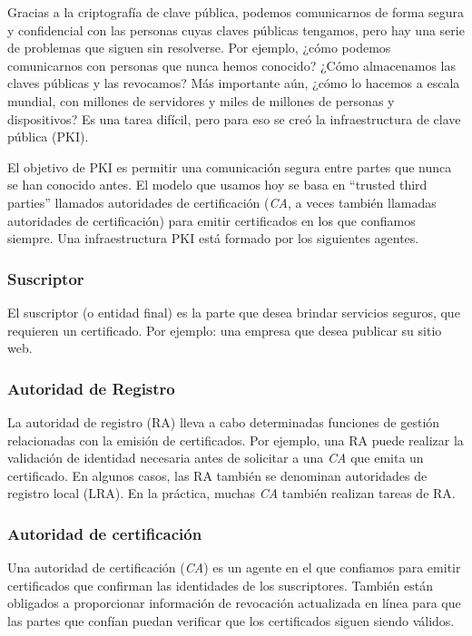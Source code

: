 
Gracias a la criptografía de clave pública, podemos comunicarnos de forma 
segura y confidencial con 
las personas cuyas claves públicas tengamos, pero hay una serie de problemas 
que siguen sin resolverse. Por ejemplo, ¿cómo podemos comunicarnos con personas que 
nunca hemos conocido? ¿Cómo almacenamos las claves públicas y las revocamos? Más 
importante aún, ¿cómo lo hacemos a escala mundial, con millones de servidores y 
miles de millones de personas y dispositivos? Es una tarea difícil, pero para eso 
se creó la infraestructura de clave pública (PKI).

El objetivo de PKI es permitir una comunicación segura entre partes que nunca se 
han conocido antes. El modelo que usamos hoy se basa en “trusted third parties” 
llamados autoridades de certificación (\emph{CA}, a veces también llamadas autoridades 
de certificación) para emitir certificados en los que confiamos siempre. Una 
infraestructura PKI está formado por los siguientes agentes.


\subsubsection*{Suscriptor}


El suscriptor (o entidad final) es la parte que desea brindar servicios 
seguros, que requieren un certificado. Por ejemplo: una empresa que desea 
publicar su sitio web.

\subsubsection*{Autoridad de Registro}

La autoridad de registro (RA) lleva a cabo determinadas funciones de gestión 
relacionadas con la emisión de certificados. Por ejemplo, una RA puede realizar 
la validación de identidad necesaria antes de solicitar a una \emph{CA} que emita un 
certificado. En algunos casos, las RA también se denominan autoridades de 
registro local (LRA). En la práctica, muchas \emph{CA} también realizan tareas de RA.

\subsubsection*{Autoridad de certificación}

Una autoridad de certificación (\emph{CA}) es un agente en el que confiamos para emitir 
certificados que confirman las identidades de los suscriptores. También están 
obligados a proporcionar información de revocación actualizada en línea para 
que las partes que confían puedan verificar que los certificados siguen siendo válidos.

